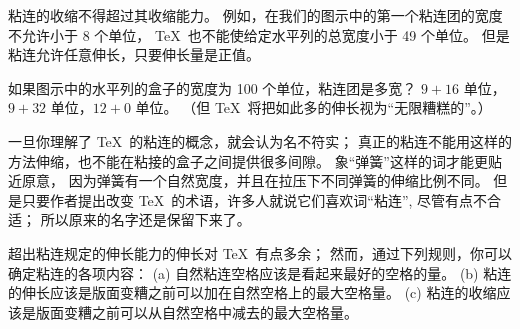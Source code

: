 粘连的收缩不得超过其收缩能力。%
例如，在我们的图示中的第一个粘连团的宽度不允许小于 8 个单位，
\TeX\ 也不能使给定水平列的总宽度小于 49 个单位。%
但是粘连允许任意伸长，只要伸长量是正值。

\exercise 如果图示中的水平列的盒子的宽度为 100 个单位，粘连团是多宽？
\answer $9+16$ 单位，$9+32$ 单位，$12+0$ 单位。%
（但 \TeX\ 将把如此多的伸长视为``无限糟糕的''。）

一旦你理解了 \TeX\ 的粘连的概念，就会认为名不符实；
真正的粘连不能用这样的方法伸缩，也不能在粘接的盒子之间提供很多间隙。%
象``弹簧''这样的词才能更贴近原意，
因为弹簧有一个自然宽度，并且在拉压下不同弹簧的伸缩比例不同。%
但是只要作者提出改变 \TeX\ 的术语，许多人就说它们喜欢词``粘连'',
尽管有点不合适；
所以原来的名字还是保留下来了。

\danger 超出粘连规定的伸长能力的伸长对 \TeX\ 有点多余；
然而，通过下列规则，你可以确定粘连的各项\hbox{内容：}
(a) 自然粘连空格应该是看起来最好的空格的量。%
(b) 粘连的伸长应该是版面变糟之前可以加在自然空格上的最大空格量。%
(c) 粘连的收缩应该是版面变糟之前可以从自然空格中减去的最大空格量。

